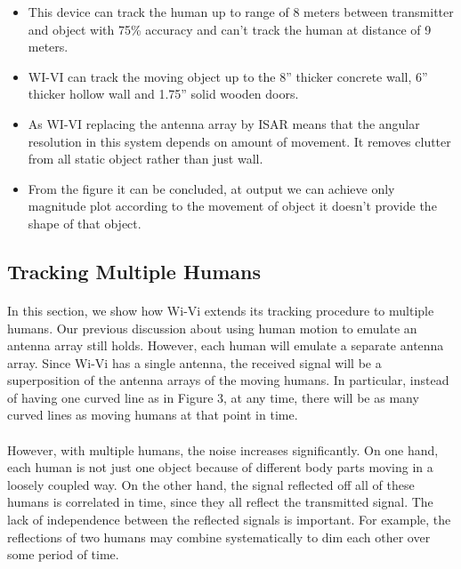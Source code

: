 \documentclass[a4paper,12pt,oneside]{article}
\begin{document}
\begin{itemize}
    \item This device can track the human up to range of 8 meters between transmitter and object
with 75\% accuracy and can’t track the human at distance of 9 meters.
    \item  WI-VI can track the moving object up to the 8” thicker concrete wall, 6” thicker hollow
wall and 1.75” solid wooden doors.
    \item As WI-VI replacing the antenna array by ISAR means that the angular resolution in this
system depends on amount of movement. It removes clutter from all static object rather
than just wall.
	\item From the figure it can be concluded, at output we can achieve only magnitude plot
according to the movement of object it doesn’t provide the shape of that object.
\end{itemize}

\subsection{Tracking Multiple Humans}
\paragraph{}
In this section, we show how Wi-Vi extends its tracking procedure to multiple humans.
Our previous discussion about using human motion to emulate an antenna array still holds.
However, each human will emulate a separate antenna array. Since Wi-Vi has a single antenna,
the received signal will be a superposition of the antenna arrays of the moving humans. In
particular, instead of having one curved line as in Figure 3, at any time, there will be as many
curved lines as moving humans at that point in time. 
\paragraph{}
However, with multiple humans, the noise
increases significantly. On one hand, each human is not just one object because of different body
parts moving in a loosely coupled way. On the other hand, the signal reflected off all of these
humans is correlated in time, since they all reflect the transmitted signal. The lack of
independence between the reflected signals is important. For example, the reflections of two
humans may combine systematically to dim each other over some period of time.
\end{document}
